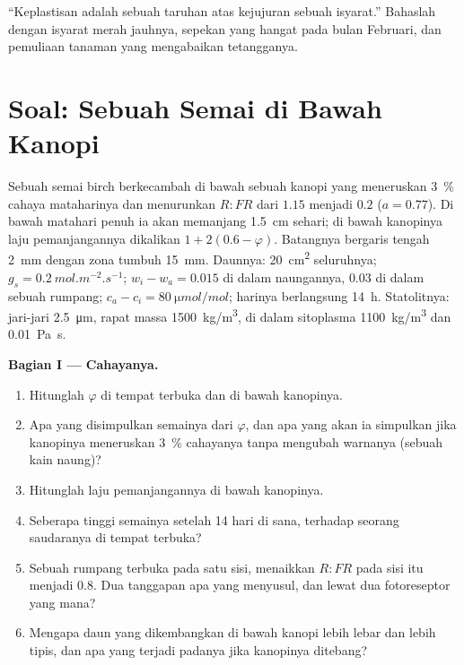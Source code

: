 \begin{exercise}[$\star\star\star$]\label{exo:b2:plant-plasticity:12}
``Keplastisan adalah sebuah taruhan atas kejujuran sebuah isyarat.''
Bahaslah dengan isyarat merah jauhnya, sepekan yang hangat pada bulan
Februari, dan pemuliaan tanaman yang mengabaikan tetangganya.
\end{exercise}

\section{Soal: Sebuah Semai di Bawah Kanopi}

\begin{problem}
\label{pb:b2:plant-plasticity:1}
Sebuah semai birch berkecambah di bawah sebuah kanopi yang meneruskan
\qty{3}{\%} cahaya mataharinya dan menurunkan $R{:}FR$ dari $1.15$
menjadi $0.2$ ($a = 0.77$). Di bawah matahari penuh ia akan memanjang
\qty{1.5}{cm} sehari; di bawah kanopinya laju pemanjangannya dikalikan
$1 +
2(0.6 - \varphi)$. Batangnya bergaris tengah \qty{2}{mm} dengan zona
tumbuh \qty{15}{mm}. Daunnya: \qty{20}{cm^2} seluruhnya; $g_s =
\qty{0.2}{mol.m^{-2}.s^{-1}}$; $w_i - w_a = 0.015$ di dalam
naungannya, $0.03$ di dalam sebuah rumpang; $c_a - c_i = \qty{80}{\micro mol/mol}$;
harinya berlangsung \qty{14}{h}. Statolitnya: jari-jari \qty{2.5}{\micro m},
rapat massa \qty{1500}{kg/m^3}, di dalam sitoplasma \qty{1100}{kg/m^3}
dan \qty{0.01}{Pa.s}.

\medskip
\noindent\textbf{Bagian I --- Cahayanya.}
\begin{enumerate}
  \item Hitunglah $\varphi$ di tempat terbuka dan di bawah kanopinya.
  \item Apa yang disimpulkan semainya dari $\varphi$, dan apa yang
        akan ia simpulkan jika kanopinya meneruskan \qty{3}{\%}
        cahayanya tanpa mengubah warnanya (sebuah kain naung)?
  \item Hitunglah laju pemanjangannya di bawah kanopinya.
  \item Seberapa tinggi semainya setelah 14 hari di sana, terhadap
        seorang saudaranya di tempat terbuka?
  \item Sebuah rumpang terbuka pada satu sisi, menaikkan $R{:}FR$ pada
        sisi itu menjadi $0.8$. Dua tanggapan apa yang menyusul, dan
        lewat dua fotoreseptor yang mana?
  \item Mengapa daun yang dikembangkan di bawah kanopi lebih lebar dan
        lebih tipis, dan apa yang terjadi padanya jika kanopinya ditebang?
\end{enumerate}


\end{problem}

